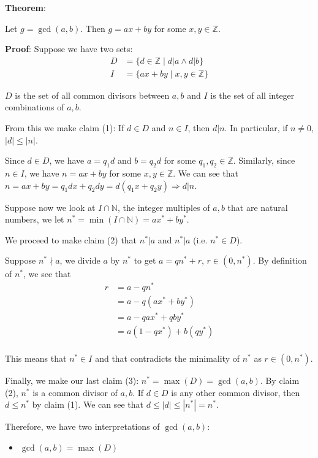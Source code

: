 \documentclass{article}
\begin{document}
\begin{multicols*}{2}
\textbf{Theorem}:

Let $g = \gcd(a, b)$. Then $g = ax + by$ for some $x, y \in \mathbb{Z}$.

\textbf{Proof}: Suppose we have two sets:
\[\begin{aligned}
D &= \{ d \in \mathbb{Z} \;|\; d|a \land d|b \} \\
I &= \{ ax + by \;|\; x,y \in \mathbb{Z}\}
\end{aligned}\]

$D$ is the set of all common divisors between $a, b$ and $I$ is the set of all integer combinations of $a, b$.

From this we make claim (1): If $d \in D$ and $n \in I$, then $d | n$. In particular, if $n \neq 0$, $|d| \leq |n|$. 

Since $d \in D$, we have $a = q_1d$ and $b = q_2d$ for some $q_1, q_2 \in \mathbb{Z}$. Similarly, since $n \in I$, we have $n = ax + by$ for some $x, y \in \mathbb{Z}$. We can see that $n = ax + by = q_1dx + q_2dy = d(q_1x + q_2y) \Rightarrow d | n$.

Suppose now we look at $I \cap \mathbb{N}$, the integer multiples of $a,b$ that are natural numbers, we let $n^* = \min(I \cap \mathbb{N}) = ax^*+by^*$.

We proceed to make claim (2) that $n^* | a$ and $n^* | a$ (i.e. $n^* \in D$).

Suppose $n^* \nmid a$, we divide $a$ by $n^*$ to get $a = qn^* + r$, $r \in (0, n^*)$. By definition of $n^*$, we see that \[\begin{aligned}
    r &= a - qn^* \\
    &= a - q(ax^* + by^*)\\
    &=a - qax^* + qby^* \\
    &=a(1 - qx^*) + b(qy^*) \\
\end{aligned}\]

This means that $n^* \in I$ and that contradicts the minimality of $n^*$ as $r \in (0, n^*)$.

Finally, we make our last claim (3): $n^* = \max(D) = \gcd(a, b)$. By claim (2), $n^*$ is a common divisor of $a, b$. If $d \in D$ is any other common divisor, then $d \leq n^*$ by claim (1). We can see that $d \leq |d| \leq |n^*| = n^*$.

Therefore, we have two interpretations of $\gcd(a, b)$:
\begin{itemize}
    \item $\gcd(a, b) = \max(D)$
    

\end{itemize}
\end{multicols*}
\end{document}

